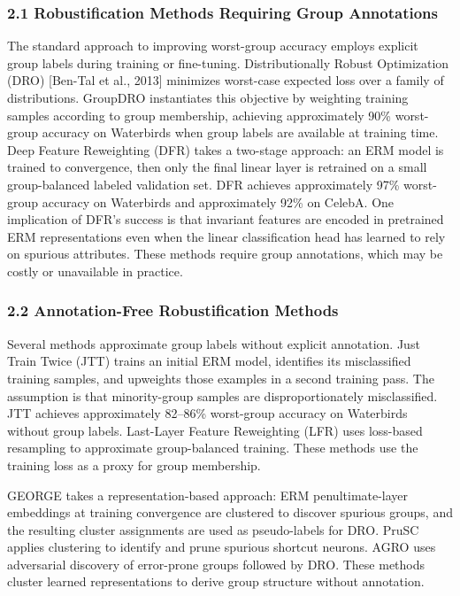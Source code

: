 
\subsubsection{2.1 Robustification Methods Requiring Group Annotations}

The standard approach to improving worst-group accuracy employs explicit group labels during training or fine-tuning. Distributionally Robust Optimization (DRO) [Ben-Tal et al., 2013] minimizes worst-case expected loss over a family of distributions. GroupDRO \citep{Sagawaetal2020} instantiates this objective by weighting training samples according to group membership, achieving approximately 90\% worst-group accuracy on Waterbirds when group labels are available at training time. Deep Feature Reweighting (DFR) \citep{Izmailovetal2022} takes a two-stage approach: an ERM model is trained to convergence, then only the final linear layer is retrained on a small group-balanced labeled validation set. DFR achieves approximately 97\% worst-group accuracy on Waterbirds and approximately 92\% on CelebA. One implication of DFR's success is that invariant features are encoded in pretrained ERM representations even when the linear classification head has learned to rely on spurious attributes. These methods require group annotations, which may be costly or unavailable in practice.

\subsubsection{2.2 Annotation-Free Robustification Methods}

Several methods approximate group labels without explicit annotation. Just Train Twice (JTT) \citep{Liuetal2021} trains an initial ERM model, identifies its misclassified training samples, and upweights those examples in a second training pass. The assumption is that minority-group samples are disproportionately misclassified. JTT achieves approximately 82–86\% worst-group accuracy on Waterbirds without group labels. Last-Layer Feature Reweighting (LFR) \citep{Ghaznavietal2023} uses loss-based resampling to approximate group-balanced training. These methods use the training loss as a proxy for group membership.

GEORGE \citep{Sohonietal2020} takes a representation-based approach: ERM penultimate-layer embeddings at training convergence are clustered to discover spurious groups, and the resulting cluster assignments are used as pseudo-labels for DRO. PruSC \citep{Kimetal2024} applies clustering to identify and prune spurious shortcut neurons. AGRO \citep{Paranjapeetal2022} uses adversarial discovery of error-prone groups followed by DRO. These methods cluster learned representations to derive group structure without annotation.

